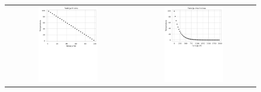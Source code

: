 \begin{figure}[!h]
	\centering
\begin{tabular}{ c c }
	\includegraphics[width=0.5\textwidth]{gfx/temp_linear.pdf} & \includegraphics[width=0.5\textwidth]{gfx/temp_quadriatic.pdf} \\

\end{tabular}
\end{figure}
